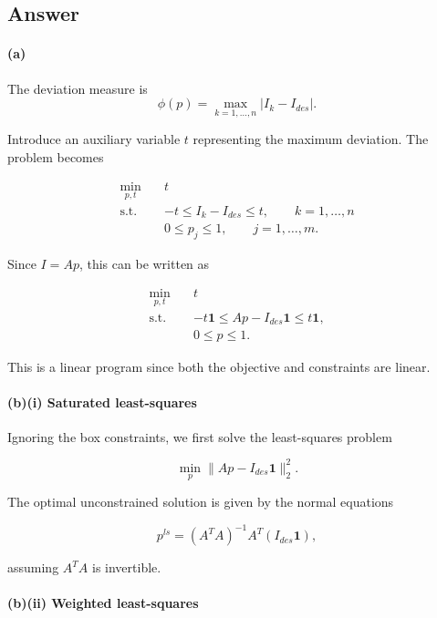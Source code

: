 \documentclass[
	12pt,
]{fphw}
\begin{document}
\subsection*{Answer}

\paragraph{(a)}

The deviation measure is
\[
\phi(p) = \max_{k=1,\ldots,n} |I_k - I_{des}|.
\]

Introduce an auxiliary variable $t$ representing the maximum deviation.  
The problem becomes

\[
\begin{aligned}
\min_{p,t} \quad & t \\
\text{s.t.}\quad 
& -t \le I_k - I_{des} \le t, \qquad k=1,\ldots,n \\
& 0 \le p_j \le 1, \qquad j=1,\ldots,m .
\end{aligned}
\]

Since $I = Ap$, this can be written as

\[
\begin{aligned}
\min_{p,t} \quad & t \\
\text{s.t.}\quad 
& -t\mathbf{1} \le Ap - I_{des}\mathbf{1} \le t\mathbf{1}, \\
& 0 \le p \le 1 .
\end{aligned}
\]

This is a linear program since both the objective and constraints are linear.


\paragraph{(b)(i) Saturated least-squares}

Ignoring the box constraints, we first solve the least-squares problem

\[
\min_p \|Ap - I_{des}\mathbf{1}\|_2^2 .
\]

The optimal unconstrained solution is given by the normal equations

\[
p^{ls} = (A^TA)^{-1}A^T(I_{des}\mathbf{1}),
\]

assuming $A^TA$ is invertible.


\paragraph{(b)(ii) Weighted least-squares}
\end{document}
